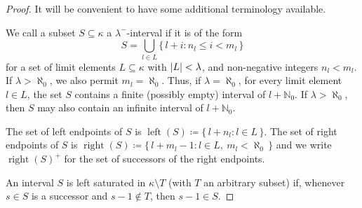 \documentclass[a4paper,11pt,oneside]{amsart}
\theoremstyle{remark}
\DeclarePairedDelimiter{\card}{\lvert}{\rvert}
\newcommand{\defit}[1]{\textsf{#1}}
\newcommand{\bN}{\mathbb N}
\DeclareMathOperator{\rep}{right}
\DeclareMathOperator{\lep}{left}
\begin{document}
\begin{proof}
  It will be convenient to have some additional terminology available.

  We call a subset $S \subseteq \kappa$ a \defit{$\lambda^-$-interval} if it is of the form
  \[
    S = \bigcup_{l \in L} \{\, l + i : n_l \le i < m_l \,\}
  \]
  for a set of limit elements $L \subseteq \kappa$ with $\card{L}< \lambda$, and non-negative integers $n_l < m_l$.
  If $\lambda > \aleph_0$, we also permit $m_l = \aleph_0$.
  Thus, if $\lambda = \aleph_0$, for every limit element $l \in L$, the set $S$ contains a finite (possibly empty) interval of $l + \bN_0$.
  If $\lambda > \aleph_0$, then $S$ may also contain an infinite interval of $l + \bN_0$.

  The set of \defit{left endpoints} of $S$ is $\lep(S) \coloneqq \{\, l + n_l : l \in L \,\}$.
  The set of \defit{right endpoints} of $S$ is $\rep(S) \coloneqq \{\, l + m_l - 1 : l \in L,\ m_l < \aleph_0 \,\}$ and we write $\rep(S)^+$ for the set of successors of the right endpoints.


  An interval $S$ is \defit{left saturated} in $\kappa \setminus T$ (with $T$ an arbitrary subset) if, whenever $s \in S$ is a successor and $s-1 \not\in T$, then $s-1 \in S$.
  

\end{proof}
\end{document}
